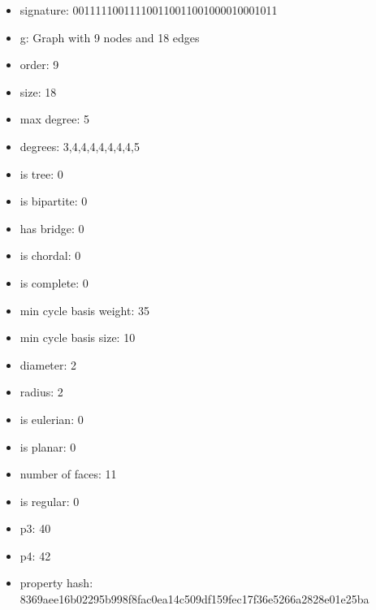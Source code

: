 \newpage
\begin{figure}
\end{figure}
\begin{itemize}
\item signature: 001111100111100110011001000010001011
\item g: Graph with 9 nodes and 18 edges
\item order: 9
\item size: 18
\item max degree: 5
\item degrees: 3,4,4,4,4,4,4,4,5
\item is tree: 0
\item is bipartite: 0
\item has bridge: 0
\item is chordal: 0
\item is complete: 0
\item min cycle basis weight: 35
\item min cycle basis size: 10
\item diameter: 2
\item radius: 2
\item is eulerian: 0
\item is planar: 0
\item number of faces: 11
\item is regular: 0
\item p3: 40
\item p4: 42
\item property hash: 8369aee16b02295b998f8fac0ea14c509df159fec17f36e5266a2828e01e25ba
\end{itemize}
